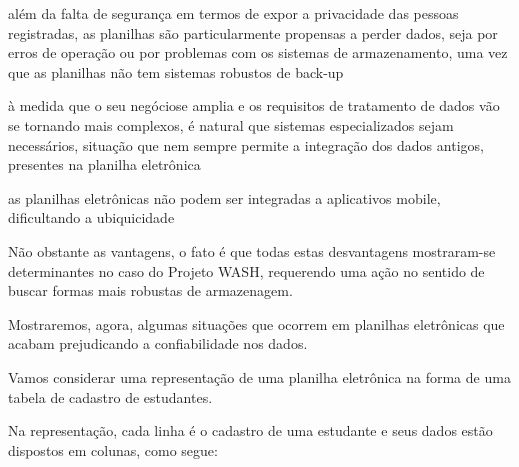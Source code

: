 \documentclass[
12pt,		%
openright,	%
twoside,  %
a4paper,			%
chapter=TITLE,		%
english,			%
french,				%
spanish,			%
brazil				%
]{USPSC-classe/USPSC}
\begin{document}
\begin{alineas}
\item al\'em da falta de seguran\c{c}a em termos de expor a privacidade das pessoas registradas, as planilhas s\~ao particularmente propensas a perder dados, seja por erros de opera\c{c}\~ao ou por problemas com os sistemas de armazenamento, uma vez que as planilhas n\~ao tem sistemas robustos de \textquotedbl back-up\textquotedbl 
\item \`a medida que o seu \textquotedbl neg\'ocio\textquotedbl  se amplia e os requisitos de tratamento de dados v\~ao se tornando mais complexos, \'e natural que sistemas especializados sejam necess\'arios, situa\c{c}\~ao que nem sempre permite a integra\c{c}\~ao dos dados antigos, presentes na planilha eletr\^onica
\item as planilhas eletr\^onicas n\~ao podem ser integradas a aplicativos mobile, dificultando a ubiquicidade
\end{alineas}

N\~ao obstante as vantagens, o fato \'e que todas estas desvantagens mostraram-se determinantes no caso do Projeto WASH, requerendo uma a\c{c}\~ao no sentido de buscar formas mais robustas de armazenagem.










Mostraremos, agora, algumas situa\c{c}\~oes que ocorrem em planilhas eletr\^onicas que acabam prejudicando a confiabilidade nos dados.










Vamos considerar uma representa\c{c}\~ao de uma planilha eletr\^onica na forma de uma tabela de cadastro de estudantes.










Na representa\c{c}\~ao, cada linha \'e o cadastro de uma estudante e seus dados est\~ao dispostos em colunas, como segue:
\end{document}
